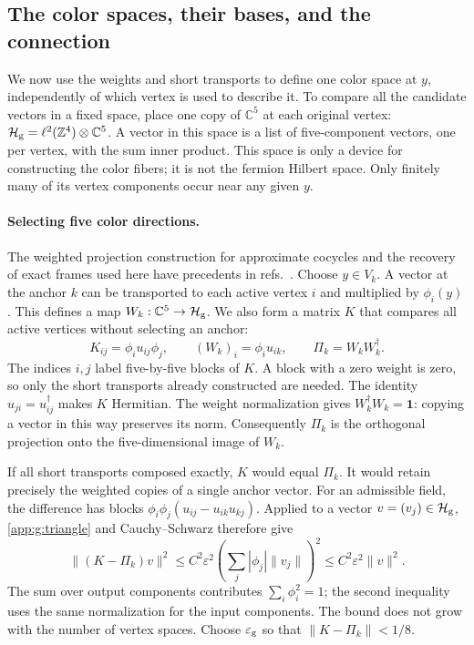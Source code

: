 \documentclass[11pt,a4paper]{article}
\theoremstyle{remark}
\newcommand{\Id}{\mathbf 1}
\newcommand{\eps}{\varepsilon}
\begin{document}
\subsection{The color spaces, their bases, and the connection}
\label{app:g:projection}

We now use the weights and short transports to define one color space at
$y$, independently of which vertex is used to describe it. To compare
all the candidate vectors in a fixed space, place one copy of
$\mathbb C^5$ at each original vertex:
$\mathcal H_{\rm g}=\ell^2(\mathbb Z^4)\otimes\mathbb C^5$.
A vector in this space is a list of five-component vectors, one per
vertex, with the sum inner product. This space is only a device for
constructing the color fibers; it is not the fermion Hilbert space.
Only finitely many of its vertex components occur near any given $y$.

\paragraph{Selecting five color directions.} The weighted projection construction for approximate cocycles and the recovery of exact frames used here have precedents in refs.~\cite{ManuilovYou,ScoccolaPerea}.
Choose $y\in V_k$. A vector at the anchor $k$ can be transported to
each active vertex $i$ and multiplied by $\phi_i(y)$. This defines a
map $W_k:\mathbb C^5\to\mathcal H_{\rm g}$. We also form a matrix
$K$ that compares all active vertices without selecting an anchor:
\begin{equation}
 K_{ij}=\phi_i u_{ij}\phi_j,\qquad
 (W_k)_i=\phi_i u_{ik},\qquad \Pi_k=W_kW_k^{\dagger} .
 \label{app:g:gram}
\end{equation}
The indices $i,j$ label five-by-five blocks of $K$. A block with a
zero weight is zero, so only the short transports already constructed
are needed. The identity $u_{ji}=u_{ij}^\dagger$ makes $K$ Hermitian.
The weight normalization gives $W_k^\dagger W_k=\Id$: copying a
vector in this way preserves its norm. Consequently $\Pi_k$ is the
orthogonal projection onto the five-dimensional image of $W_k$.

If all short transports composed exactly, $K$ would equal $\Pi_k$.
It would retain precisely the weighted copies of a single anchor
vector. For an admissible field, the difference has blocks
$\phi_i\phi_j(u_{ij}-u_{ik}u_{kj})$. Applied to a vector
$v=(v_j)\in\mathcal H_{\rm g}$, \eqref{app:g:triangle} and
Cauchy--Schwarz therefore give
\begin{equation}
 \|(K-\Pi_k)v\|^2
 \le C^2\eps^2
       \left(\sum_j|\phi_j|\|v_j\|\right)^2
 \le C^2\eps^2\|v\|^2 .
\end{equation}
The sum over output components contributes $\sum_i\phi_i^2=1$;
the second inequality uses the same normalization for the input
components. The bound does not grow with the number of vertex spaces.
Choose $\eps_{\rm g}$ so that $\|K-\Pi_k\|<1/8$.
\end{document}
